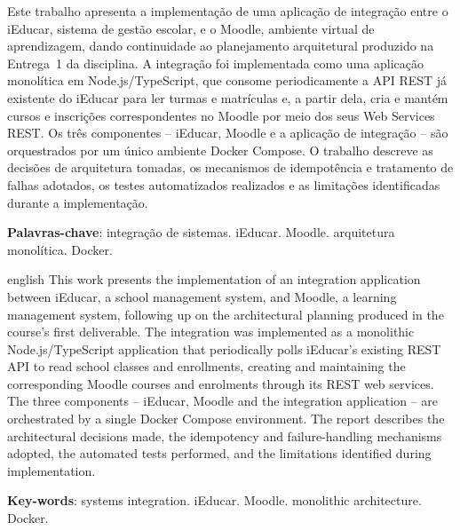 \documentclass[
	12pt, openright, twoside, a4paper,
	english,
	brazil
	]{abntex2}
\begin{document}
\frenchspacing


\imprimircapa
\imprimirfolhaderosto

\setlength{\absparsep}{18pt}
\begin{resumo}
Este trabalho apresenta a implementa\c{c}\~ao de uma aplica\c{c}\~ao de integra\c{c}\~ao entre o
iEducar, sistema de gest\~ao escolar, e o Moodle, ambiente virtual de aprendizagem, dando
continuidade ao planejamento arquitetural produzido na Entrega~1 da disciplina. A integra\c{c}\~ao
foi implementada como uma aplica\c{c}\~ao monol\'itica em Node.js/TypeScript, que consome
periodicamente a API REST j\'a existente do iEducar para ler turmas e matr\'iculas e, a partir
dela, cria e mant\'em cursos e inscri\c{c}\~oes correspondentes no Moodle por meio dos seus Web
Services REST. Os tr\^es componentes -- iEducar, Moodle e a aplica\c{c}\~ao de integra\c{c}\~ao --
s\~ao orquestrados por um \'unico ambiente Docker Compose. O trabalho descreve as decis\~oes de
arquitetura tomadas, os mecanismos de idempot\^encia e tratamento de falhas adotados, os testes
automatizados realizados e as limita\c{c}\~oes identificadas durante a implementa\c{c}\~ao.

\vspace{\onelineskip}

\noindent
\textbf{Palavras-chave}: integra\c{c}\~ao de sistemas. iEducar. Moodle. arquitetura monol\'itica. Docker.
\end{resumo}

\begin{resumo}[Abstract]
 \begin{otherlanguage*}{english}
This work presents the implementation of an integration application between iEducar, a school
management system, and Moodle, a learning management system, following up on the architectural
planning produced in the course's first deliverable. The integration was implemented as a
monolithic Node.js/TypeScript application that periodically polls iEducar's existing REST API to
read school classes and enrollments, creating and maintaining the corresponding Moodle courses and
enrolments through its REST web services. The three components -- iEducar, Moodle and the
integration application -- are orchestrated by a single Docker Compose environment. The report
describes the architectural decisions made, the idempotency and failure-handling mechanisms
adopted, the automated tests performed, and the limitations identified during implementation.

   \vspace{\onelineskip}

   \noindent
   \textbf{Key-words}: systems integration. iEducar. Moodle. monolithic architecture. Docker.
 \end{otherlanguage*}
\end{resumo}
\end{document}
